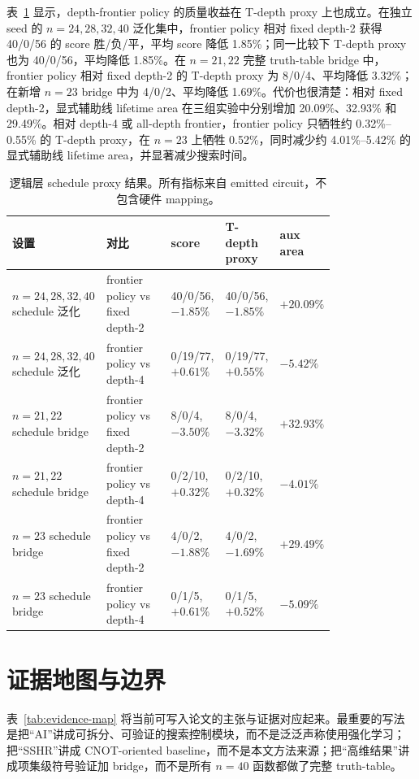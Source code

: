 \documentclass[UTF8,fontset=macnew,11pt]{ctexart}
\newcommand{\ttable}{truth-table}
\begin{document}
表~\ref{tab:schedule} 显示，depth-frontier policy 的质量收益在 T-depth proxy 上也成立。在独立 seed 的 $n=24,28,32,40$ 泛化集中，frontier policy 相对 fixed depth-2 获得 40/0/56 的 score 胜/负/平，平均 score 降低 1.85\%；同一比较下 T-depth proxy 也为 40/0/56，平均降低 1.85\%。在 $n=21,22$ 完整 \ttable{} bridge 中，frontier policy 相对 fixed depth-2 的 T-depth proxy 为 8/0/4、平均降低 3.32\%；在新增 $n=23$ bridge 中为 4/0/2、平均降低 1.69\%。代价也很清楚：相对 fixed depth-2，显式辅助线 lifetime area 在三组实验中分别增加 20.09\%、32.93\% 和 29.49\%。相对 depth-4 或 all-depth frontier，frontier policy 只牺牲约 0.32\%--0.55\% 的 T-depth proxy，在 $n=23$ 上牺牲 0.52\%，同时减少约 4.01\%--5.42\% 的显式辅助线 lifetime area，并显著减少搜索时间。

\begin{table}[H]
\centering
\tiny
\caption{逻辑层 schedule proxy 结果。所有指标来自 emitted circuit，不包含硬件 mapping。}
\label{tab:schedule}
\begin{tabular}{@{}p{0.20\linewidth}p{0.20\linewidth}p{0.14\linewidth}p{0.15\linewidth}p{0.10\linewidth}@{}}
\toprule
设置 & 对比 & score & T-depth proxy & aux area \\
\midrule
$n=24,28,32,40$ schedule 泛化 & frontier policy vs fixed depth-2 & 40/0/56, $-1.85\%$ & 40/0/56, $-1.85\%$ & $+20.09\%$ \\
$n=24,28,32,40$ schedule 泛化 & frontier policy vs depth-4 & 0/19/77, $+0.61\%$ & 0/19/77, $+0.55\%$ & $-5.42\%$ \\
$n=21,22$ schedule bridge & frontier policy vs fixed depth-2 & 8/0/4, $-3.50\%$ & 8/0/4, $-3.32\%$ & $+32.93\%$ \\
$n=21,22$ schedule bridge & frontier policy vs depth-4 & 0/2/10, $+0.32\%$ & 0/2/10, $+0.32\%$ & $-4.01\%$ \\
$n=23$ schedule bridge & frontier policy vs fixed depth-2 & 4/0/2, $-1.88\%$ & 4/0/2, $-1.69\%$ & $+29.49\%$ \\
$n=23$ schedule bridge & frontier policy vs depth-4 & 0/1/5, $+0.61\%$ & 0/1/5, $+0.52\%$ & $-5.09\%$ \\
\bottomrule
\end{tabular}
\end{table}

\section{证据地图与边界}

表~\ref{tab:evidence-map} 将当前可写入论文的主张与证据对应起来。最重要的写法是把“AI”讲成可拆分、可验证的搜索控制模块，而不是泛泛声称使用强化学习；把“SSHR”讲成 CNOT-oriented baseline，而不是本文方法来源；把“高维结果”讲成项集级符号验证加 bridge，而不是所有 $n=40$ 函数都做了完整 \ttable{}。
\end{document}
